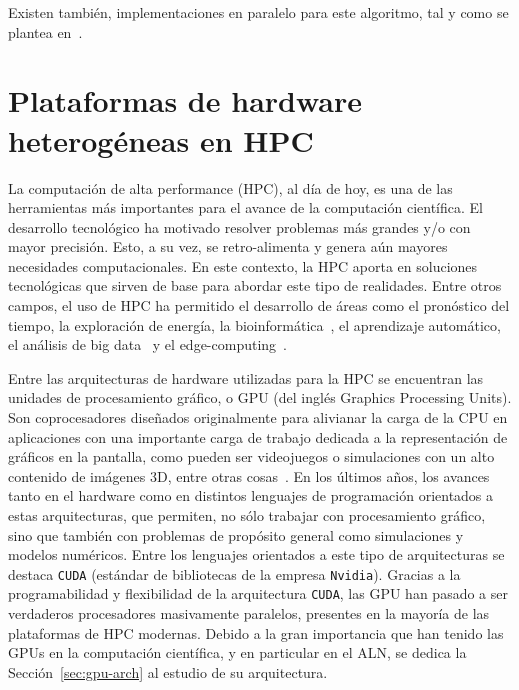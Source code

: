 Existen también, implementaciones en paralelo para este algoritmo, tal y como se  plantea en~\cite{sloan-parallel}.



\newpage\section{Plataformas de hardware heterogéneas en HPC}


La computación de alta performance (HPC), al día de hoy, es una de las herramientas más importantes para el avance de la computación científica. 
El desarrollo tecnológico ha motivado resolver problemas más grandes y/o con mayor precisión. Esto, a su vez, se retro-alimenta y genera aún mayores necesidades computacionales. En este contexto, la HPC aporta en soluciones tecnológicas que sirven de base para abordar este tipo de realidades. Entre otros campos, el uso de HPC ha permitido el desarrollo de áreas %
como el pronóstico del tiempo, la exploración de energía, la bioinformática~\cite{hpc-bioinformatics}, el %
aprendizaje automático, el análisis de big data~\cite{big-data2015} y el edge-computing~\cite{Tu2019}.


Entre las arquitecturas de hardware utilizadas para la HPC se encuentran las unidades de procesamiento gráfico, o GPU (del inglés Graphics Processing Units). Son coprocesadores diseñados originalmente para alivianar la carga de la CPU en aplicaciones con una importante carga de trabajo dedicada a la representación de gráficos en la pantalla, como pueden ser videojuegos o simulaciones con un alto contenido de imágenes 3D, entre otras cosas~\cite{Kirk2013}. 
En los últimos años, los avances tanto en el hardware como en distintos lenguajes de programación orientados a estas arquitecturas, que permiten, no sólo trabajar con procesamiento gráfico, sino que también con problemas de propósito general como simulaciones y modelos numéricos. Entre los lenguajes orientados a este tipo de arquitecturas se destaca \texttt{CUDA} (estándar de bibliotecas de la empresa \texttt{Nvidia}). Gracias a la programabilidad y flexibilidad de la arquitectura \texttt{CUDA}, las GPU han pasado a ser verdaderos procesadores masivamente paralelos, presentes en la mayoría de las plataformas de HPC modernas.
Debido a la gran importancia que han tenido las GPUs en la computación científica, y en particular en el ALN, se dedica la Sección~\ref{sec:gpu-arch} al estudio de su arquitectura.



